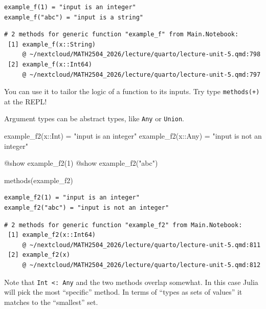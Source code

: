 \documentclass[
]{article}
\newenvironment{Shaded}{\begin{snugshade}}{\end{snugshade}}
\newcommand{\DataTypeTok}[1]{\textcolor[rgb]{0.68,0.00,0.00}{#1}}
\newcommand{\FloatTok}[1]{\textcolor[rgb]{0.68,0.00,0.00}{#1}}
\newcommand{\FunctionTok}[1]{\textcolor[rgb]{0.28,0.35,0.67}{#1}}
\newcommand{\NormalTok}[1]{\textcolor[rgb]{0.00,0.23,0.31}{#1}}
\newcommand{\OperatorTok}[1]{\textcolor[rgb]{0.37,0.37,0.37}{#1}}
\newcommand{\PreprocessorTok}[1]{\textcolor[rgb]{0.68,0.00,0.00}{#1}}
\newcommand{\StringTok}[1]{\textcolor[rgb]{0.13,0.47,0.30}{#1}}
\begin{document}
\begin{verbatim}
example_f(1) = "input is an integer"
example_f("abc") = "input is a string"
\end{verbatim}

\begin{verbatim}
# 2 methods for generic function "example_f" from Main.Notebook:
 [1] example_f(x::String)
     @ ~/nextcloud/MATH2504_2026/lecture/quarto/lecture-unit-5.qmd:798
 [2] example_f(x::Int64)
     @ ~/nextcloud/MATH2504_2026/lecture/quarto/lecture-unit-5.qmd:797
\end{verbatim}

You can use it to tailor the logic of a function to its inputs. Try type
\texttt{methods(+)} at the REPL!

Argument types can be abstract types, like \texttt{Any} or
\texttt{Union}.

\begin{Shaded}
\begin{Highlighting}[]
\FunctionTok{example\_f2}\NormalTok{(x}\OperatorTok{::}\DataTypeTok{Int}\NormalTok{) }\OperatorTok{=} \StringTok{"input is an integer"}
\FunctionTok{example\_f2}\NormalTok{(x}\OperatorTok{::}\DataTypeTok{Any}\NormalTok{) }\OperatorTok{=} \StringTok{"input is not an integer"}

\PreprocessorTok{@show} \FunctionTok{example\_f2}\NormalTok{(}\FloatTok{1}\NormalTok{)}
\PreprocessorTok{@show} \FunctionTok{example\_f2}\NormalTok{(}\StringTok{"abc"}\NormalTok{)}

\FunctionTok{methods}\NormalTok{(example\_f2)}
\end{Highlighting}
\end{Shaded}

\begin{verbatim}
example_f2(1) = "input is an integer"
example_f2("abc") = "input is not an integer"
\end{verbatim}

\begin{verbatim}
# 2 methods for generic function "example_f2" from Main.Notebook:
 [1] example_f2(x::Int64)
     @ ~/nextcloud/MATH2504_2026/lecture/quarto/lecture-unit-5.qmd:811
 [2] example_f2(x)
     @ ~/nextcloud/MATH2504_2026/lecture/quarto/lecture-unit-5.qmd:812
\end{verbatim}

Note that \texttt{Int\ \textless{}:\ Any} and the two methods overlap
somewhat. In this case Julia will pick the most ``specific'' method. In
terms of ``types as sets of values'' it matches to the ``smallest'' set.
\end{document}
